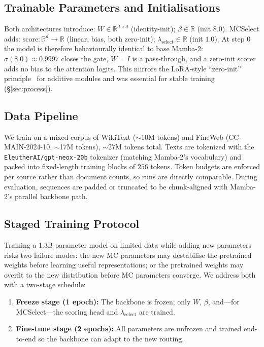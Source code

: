 \documentclass[conference]{IEEEtran}
\begin{document}
\subsection{Trainable Parameters and Initialisations}

Both architectures introduce: $W\!\in\!\mathbb{R}^{d\times d}$ (identity-init); $\beta\!\in\!\mathbb{R}$ (init $8.0$). MCSelect adds: $\mathrm{score}\!:\!\mathbb{R}^d\!\to\!\mathbb{R}$ (linear, bias, both zero-init); $\lambda_{\text{select}}\!\in\!\mathbb{R}$ (init $1.0$). At step 0 the model is therefore behaviourally identical to base Mamba-2: $\sigma(8.0)\!\approx\!0.9997$ closes the gate, $W=I$ is a pass-through, and a zero-init scorer adds no bias to the attention logits. This mirrors the LoRA-style ``zero-init'' principle~\cite{hu2021loralowrankadaptationlarge} for additive modules and was essential for stable training (\S\ref{sec:process}).

\subsection{Data Pipeline}

We train on a mixed corpus of WikiText ($\sim$10M tokens) and FineWeb (CC-MAIN-2024-10, $\sim$17M tokens), $\sim$27M tokens total. Texts are tokenized with the \texttt{EleutherAI/gpt-neox-20b} tokenizer (matching Mamba-2's vocabulary) and packed into fixed-length training blocks of $256$ tokens. Token budgets are enforced per source rather than document counts, so runs are directly comparable. During evaluation, sequences are padded or truncated to be chunk-aligned with Mamba-2's parallel backbone path.

\subsection{Staged Training Protocol}

Training a 1.3B-parameter model on limited data while adding new parameters risks two failure modes: the new MC parameters may destabilise the pretrained weights before learning useful representations; or the pretrained weights may overfit to the new distribution before MC parameters converge. We address both with a two-stage schedule:

\begin{enumerate}
    \item \textbf{Freeze stage (1 epoch):} The backbone is frozen; only $W$, $\beta$, and---for MCSelect---the scoring head and $\lambda_{\text{select}}$ are trained.
    \item \textbf{Fine-tune stage (2 epochs):} All parameters are unfrozen and trained end-to-end so the backbone can adapt to the new routing.
\end{enumerate}
\end{document}
